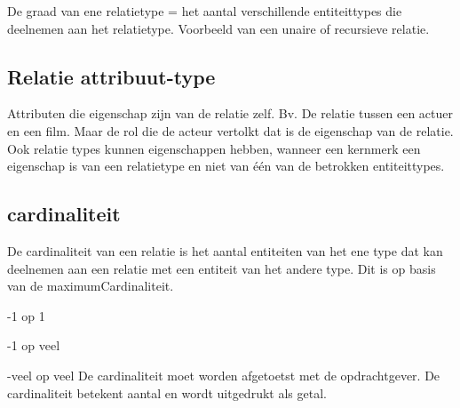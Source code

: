 \documentclass{article}
\begin{document}
De graad van ene relatietype = het aantal verschillende entiteittypes die deelnemen aan het relatietype.
Voorbeeld van een unaire of recursieve relatie.


\subsection{Relatie attribuut-type}
Attributen die eigenschap zijn van de relatie zelf.
Bv. De relatie tussen een actuer en een film. Maar de rol die de acteur vertolkt dat is de eigenschap van de relatie. 
Ook relatie types kunnen eigenschappen hebben, wanneer een kernmerk een eigenschap is van een relatietype en niet van één van de betrokken entiteittypes.

\subsection{cardinaliteit}
De cardinaliteit van een relatie is het aantal entiteiten van het ene type dat kan deelnemen aan een relatie met een entiteit van het andere type.
Dit is op basis van de maximumCardinaliteit.

	-1 op 1

	-1 op veel

	-veel op veel
De cardinaliteit moet worden afgetoetst met de opdrachtgever.
De cardinaliteit betekent aantal en wordt uitgedrukt als getal.
\end{document}
